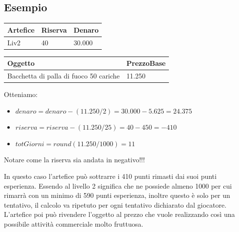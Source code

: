\documentclass[a4paper,12pt]{book}
\begin{document}
\subsection{Esempio}

\begin{tabular}{|l|l|l|}
\hline
Artefice& Riserva&Denaro\\
\hline
Liv2 & 40&30.000\\
\hline
\end{tabular}

\saltariga
\saltariga

\begin{tabular}{|l|l|}
\hline
Oggetto& PrezzoBase\\
\hline
Bacchetta di palla di fuoco 50 cariche & 11.250\\
\hline
\end{tabular}

\saltariga
Otteniamo:

\begin{itemize}

\item{ $ denaro = denaro - (11.250 / 2)  = 30.000 - 5.625 = 24.375 $}
\item{ $ riserva = riserva - (11.250 /25) = 40 - 450 = - 410 $}
\item{ $ totGiorni = round(11.250 / 1000) = 11 $ }

\end{itemize}

Notare come la riserva sia andata in negativo!!!
\saltariga

In questo caso l'artefice può sottrarre i 410 punti rimasti dai suoi punti esperienza. Essendo al livello 2 significa che ne possiede almeno 1000 per cui rimarrà con un minimo di 590 punti esperienza, inoltre questo è solo per un tentativo, il calcolo va ripetuto per ogni tentativo dichiarato dal giocatore.
L'artefice poi può rivendere l'oggetto al prezzo che vuole realizzando così una possibile attività commerciale molto fruttuosa.
\end{document}
